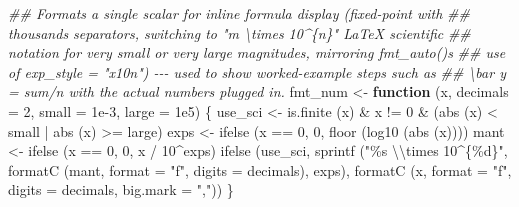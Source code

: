 \documentclass[
  letterpaper,
  DIV=11,
  numbers=noendperiod]{scrreprt}
\newenvironment{Shaded}{\begin{snugshade}}{\end{snugshade}}
\newcommand{\AttributeTok}[1]{\textcolor[rgb]{0.40,0.45,0.13}{#1}}
\newcommand{\ControlFlowTok}[1]{\textcolor[rgb]{0.00,0.23,0.31}{\textbf{#1}}}
\newcommand{\DecValTok}[1]{\textcolor[rgb]{0.68,0.00,0.00}{#1}}
\newcommand{\DocumentationTok}[1]{\textcolor[rgb]{0.37,0.37,0.37}{\textit{#1}}}
\newcommand{\FloatTok}[1]{\textcolor[rgb]{0.68,0.00,0.00}{#1}}
\newcommand{\FunctionTok}[1]{\textcolor[rgb]{0.28,0.35,0.67}{#1}}
\newcommand{\NormalTok}[1]{\textcolor[rgb]{0.00,0.23,0.31}{#1}}
\newcommand{\OtherTok}[1]{\textcolor[rgb]{0.00,0.23,0.31}{#1}}
\newcommand{\SpecialCharTok}[1]{\textcolor[rgb]{0.37,0.37,0.37}{#1}}
\newcommand{\StringTok}[1]{\textcolor[rgb]{0.13,0.47,0.30}{#1}}
\renewcommand{\[}{\begin{equation}}
\renewcommand{\]}{\end{equation}}
\begin{document}
\begin{Shaded}
\begin{Highlighting}[]
\DocumentationTok{\#\# Formats a single scalar for inline formula display (fixed{-}point with}
\DocumentationTok{\#\# thousands separators, switching to "m \textbackslash{}times 10\^{}\{n\}" LaTeX scientific}
\DocumentationTok{\#\# notation for very small or very large magnitudes, mirroring fmt\_auto()\textquotesingle{}s}
\DocumentationTok{\#\# use of exp\_style = "x10n") {-}{-}{-} used to show worked{-}example steps such as}
\DocumentationTok{\#\# \textbackslash{}bar y = sum/n with the actual numbers plugged in.}
\NormalTok{fmt\_num }\OtherTok{\textless{}{-}} \ControlFlowTok{function}\NormalTok{ (x, }\AttributeTok{decimals =} \DecValTok{2}\NormalTok{, }\AttributeTok{small =} \FloatTok{1e{-}3}\NormalTok{, }\AttributeTok{large =} \FloatTok{1e5}\NormalTok{)}
\NormalTok{\{}
\NormalTok{    use\_sci }\OtherTok{\textless{}{-}} \FunctionTok{is.finite}\NormalTok{ (x) }\SpecialCharTok{\&}\NormalTok{ x }\SpecialCharTok{!=} \DecValTok{0} \SpecialCharTok{\&}\NormalTok{ (}\FunctionTok{abs}\NormalTok{ (x) }\SpecialCharTok{\textless{}}\NormalTok{ small }\SpecialCharTok{|} \FunctionTok{abs}\NormalTok{ (x) }\SpecialCharTok{\textgreater{}=}\NormalTok{ large)}
\NormalTok{    exps    }\OtherTok{\textless{}{-}} \FunctionTok{ifelse}\NormalTok{ (x }\SpecialCharTok{==} \DecValTok{0}\NormalTok{, }\DecValTok{0}\NormalTok{, }\FunctionTok{floor}\NormalTok{ (}\FunctionTok{log10}\NormalTok{ (}\FunctionTok{abs}\NormalTok{ (x))))}
\NormalTok{    mant    }\OtherTok{\textless{}{-}} \FunctionTok{ifelse}\NormalTok{ (x }\SpecialCharTok{==} \DecValTok{0}\NormalTok{, }\DecValTok{0}\NormalTok{, x }\SpecialCharTok{/} \DecValTok{10}\SpecialCharTok{\^{}}\NormalTok{exps)}
    \FunctionTok{ifelse}\NormalTok{ (use\_sci,}
            \FunctionTok{sprintf}\NormalTok{ (}\StringTok{"\%s }\SpecialCharTok{\textbackslash{}\textbackslash{}}\StringTok{times 10\^{}\{\%d\}"}\NormalTok{, }\FunctionTok{formatC}\NormalTok{ (mant, }\AttributeTok{format =} \StringTok{"f"}\NormalTok{, }\AttributeTok{digits =}\NormalTok{ decimals), exps),}
            \FunctionTok{formatC}\NormalTok{ (x, }\AttributeTok{format =} \StringTok{"f"}\NormalTok{, }\AttributeTok{digits =}\NormalTok{ decimals, }\AttributeTok{big.mark =} \StringTok{","}\NormalTok{))}
\NormalTok{\}}


\end{Highlighting}
\end{Shaded}
\end{document}
